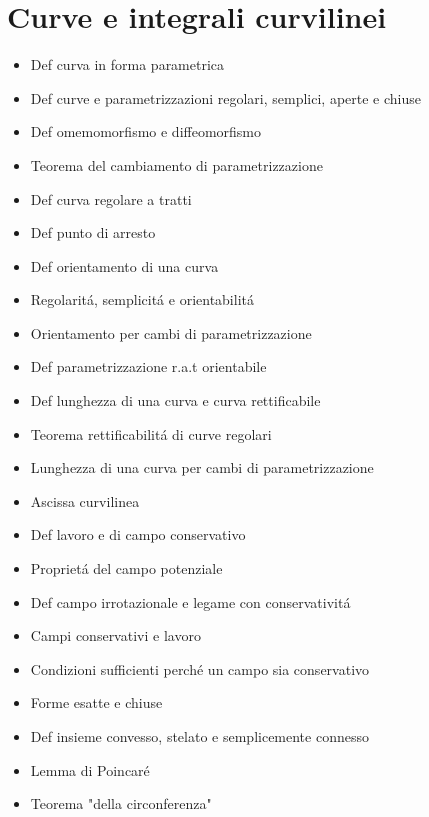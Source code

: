 \documentclass[10pt,a4paper, twocolumn]{article}
\renewcommand{\,}{\text{, }}
\begin{document}
\section{Curve e integrali curvilinei}
\begin{itemize}
    \item Def curva in forma parametrica
    \item Def curve e parametrizzazioni regolari, semplici, aperte e chiuse
    \item Def omemomorfismo e diffeomorfismo
    \item Teorema del cambiamento di parametrizzazione
    \item Def curva regolare a tratti
    \item Def punto di arresto
    \item Def orientamento di una curva
    \item Regolarit\'a, semplicit\'a e orientabilit\'a
    \item Orientamento per cambi di parametrizzazione
    \item Def parametrizzazione r.a.t orientabile
    \item Def lunghezza di una curva e curva rettificabile
    \item Teorema rettificabilit\'a di curve regolari
    \item Lunghezza di una curva per cambi di parametrizzazione
    \item Ascissa curvilinea
    \item Def lavoro e di campo conservativo
    \item Propriet\'a del campo potenziale
    \item Def campo irrotazionale e legame con conservativit\'a
    \item Campi conservativi e lavoro
    \item Condizioni sufficienti perch\'e un campo sia conservativo
    \item Forme esatte e chiuse
    \item Def insieme convesso, stelato e semplicemente connesso
    \item Lemma di Poincar\'e
    \item Teorema "della circonferenza"
\end{itemize}
\end{document}
